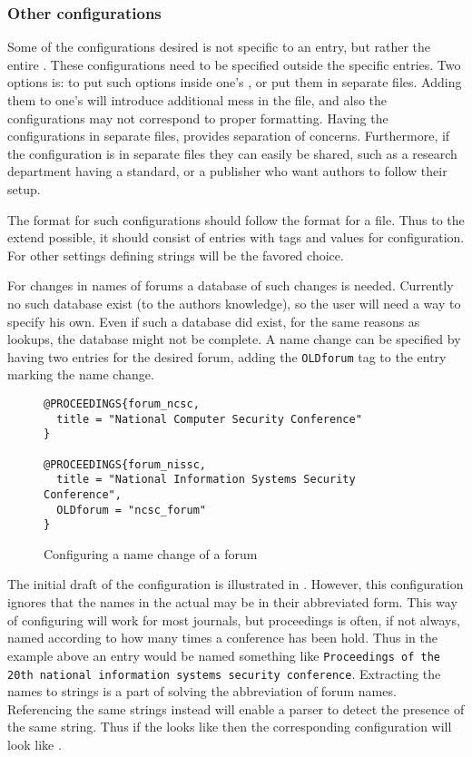 \subsubsection{Other configurations}

Some of the configurations desired is not specific to an entry, but
rather the entire .  These configurations need to be
specified outside the specific entries.  Two options is: to put such
options inside one's , or put them in separate files.
Adding them to one's  will introduce additional mess in the
file, and also the configurations may not correspond to proper
{\bibtex} formatting.  Having the configurations in separate files,
provides separation of concerns.  Furthermore, if the configuration is
in separate files they can easily be shared, such as a research
department having a standard, or a publisher who want authors to
follow their setup.

The format for such configurations should follow the format for a
{\bibtex} file.  Thus to the extend possible, it should consist of
entries with tags and values for configuration.  For other settings
defining {\bibtex} strings will be the favored choice.

For changes in names of forums a database of such changes is needed.
Currently no such database exist (to the authors knowledge), so the
user will need a way to specify his own.  Even if such a database did
exist, for the same reasons as lookups, the database might not be
complete.  A name change can be specified by having two entries for
the desired forum, adding the \texttt{OLDforum} tag to the entry
marking the name change.

\begin{figure}
  \centering
\begin{verbatim}
@PROCEEDINGS{forum_ncsc,
  title = "National Computer Security Conference"
}

@PROCEEDINGS{forum_nissc,
  title = "National Information Systems Security Conference",
  OLDforum = "ncsc_forum"
}
\end{verbatim}
  \caption{Configuring a name change of a forum}
  \label{fig:analyzing_configuration_name_change}
\end{figure}

The initial draft of the configuration is illustrated in
.  However, this
configuration ignores that the names in the actual  may be
in their abbreviated form.  This way of configuring will work for most
journals, but proceedings is often, if not always, named according to
how many times a conference has been hold.  Thus in the example above
an entry would be named something like \texttt{Proceedings of the 20th
  national information systems security conference}.  Extracting the
names to strings is a part of solving the abbreviation of forum names.
Referencing the same strings instead will enable a parser to detect
the presence of the same string.  Thus if the  looks like
 then
the corresponding configuration will look like .

